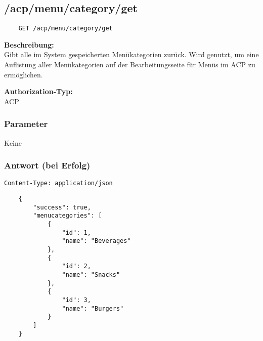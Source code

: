 \subsection{/acp/menu/category/get}

\begin{lstlisting}
    GET /acp/menu/category/get
\end{lstlisting}

\textbf{Beschreibung:} \\
Gibt alle im System gespeicherten Menükategorien zurück. Wird genutzt, um eine Auflistung aller Menükategorien auf der Bearbeitungsseite für Menüs im ACP zu ermöglichen.

\textbf{Authorization-Typ:} \\
ACP

\subsubsection{Parameter}
Keine

\subsubsection{Antwort (bei Erfolg)}

\lstinline{Content-Type: application/json}
\begin{lstlisting}
    {
        "success": true, 
        "menucategories": [
            {
                "id": 1,
                "name": "Beverages"
            },
            {
                "id": 2,
                "name": "Snacks"
            },
            {
                "id": 3,
                "name": "Burgers"
            }
        ]
    }
\end{lstlisting}
